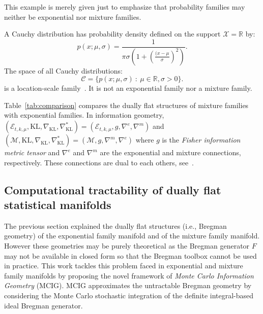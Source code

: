 \documentclass[graybox]{svmult}
\def\calC{\mathcal{C}}
\def\KL{\mathrm{KL}}
\def\bbR{\mathbb{R}}
\def\calE{\mathcal{E}}
\def\calX{\mathcal{X}}
\def\calM{\mathcal{M}}
\def\st{{\ :\ }}
\begin{document}
This example is merely given just to emphasize that probability families may neither be exponential nor mixture families.
	
	A Cauchy distribution has probability density  defined on the support $\calX=\bbR$ by:
	\begin{equation} 
p(x;\mu,\sigma) = \frac{1}{\pi \sigma \left(1+\left(\frac{(x-\mu}{\sigma}\right)^2\right)} .
\end{equation}
	The space of all Cauchy distributions:
	\begin{equation}
	\calC=\{p(x;\mu,\sigma) \st \mu\in\bbR, \sigma>0\}.
		\end{equation}
	is a location-scale family~\cite{KassVos-1997}. It is not an exponential family nor a mixture family.
	
	
 

	Table~\ref{tab:comparison} compares the dually flat structures of mixture families with exponential families.
	In information geometry, $(\calE_{t,k,\mu},\KL,\nabla_\KL,\nabla_\KL^*)=(\calE_{t,k,\mu},g,\nabla^e,\nabla^m)$ and 
	$(\calM,\KL,\nabla_\KL,\nabla_\KL^*)=(\calM,g,\nabla^m,\nabla^e)$
	where $g$ is the {\em Fisher information metric tensor} and $\nabla^e$ and $\nabla^m$ are the exponential and mixture connections, respectively.
	These connections are dual to each others, see~\cite{IG-2014}.
	
	


\subsection{Computational tractability of dually flat statistical manifolds}\label{sec:comptract}

The previous section explained the dually flat structures (i.e., Bregman geometry) of the exponential family manifold and of the mixture family manifold.
However these geometries may be purely theoretical as the Bregman generator $F$ may not be available in closed form so that the Bregman toolbox cannot be used in practice.
This work tackles this problem faced in exponential and mixture family manifolds by proposing the novel framework of
 {\em Monte Carlo Information Geometry} (MCIG).
MCIG approximates the untractable Bregman geometry by considering the Monte Carlo stochastic integration of the definite integral-based ideal Bregman generator.
\end{document}
